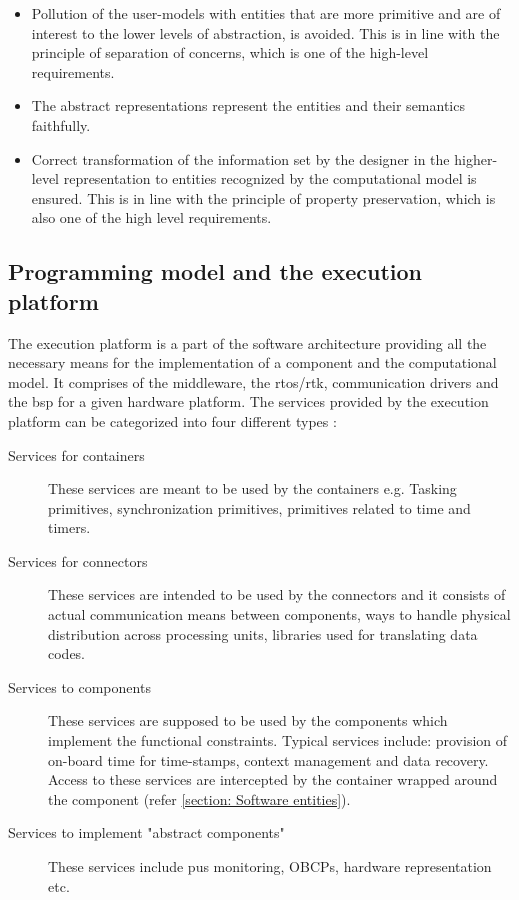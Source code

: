 \begin{itemize}
\item Pollution of the user-models with entities that are more primitive and are of interest to the lower levels of abstraction, is avoided. This is in line with the principle of separation of concerns, which is one of the high-level requirements.

\item The abstract representations represent the entities and their semantics faithfully.

\item Correct transformation of the information set by the designer in the higher-level representation to entities recognized by the computational model is ensured. This is in line with the principle of property preservation, which is also one of the high level requirements. 
\end{itemize} 

\subsection{Programming model and the execution platform}
\label{section: Execution platform}
The execution platform is a part of the software architecture providing all the necessary means for the implementation of a component and the computational model. It comprises of the middleware, the \ac{rtos}/\ac{rtk}, communication drivers and the \ac{bsp} for a given hardware platform. The services provided by the execution platform can be categorized into four different types \cite{SAVOIR}:

\begin{description}
\item [Services for containers] These services are meant to be used by the containers e.g. Tasking primitives, synchronization primitives, primitives related to time and timers.

\item [Services for connectors] These services are intended to be used by the connectors and it consists of actual communication means between components, ways to handle physical distribution across processing units, libraries used for translating data codes.

\item [Services to components] These services are supposed to be used by the components which implement the functional constraints. Typical services include: provision of on-board time for time-stamps, context management and data recovery. Access to these services are intercepted by the container wrapped around the component (refer \cref{section: Software entities}).

\item [Services to implement "abstract components"] These services include \ac{pus} monitoring, OBCPs, hardware representation etc.
\end{description}

